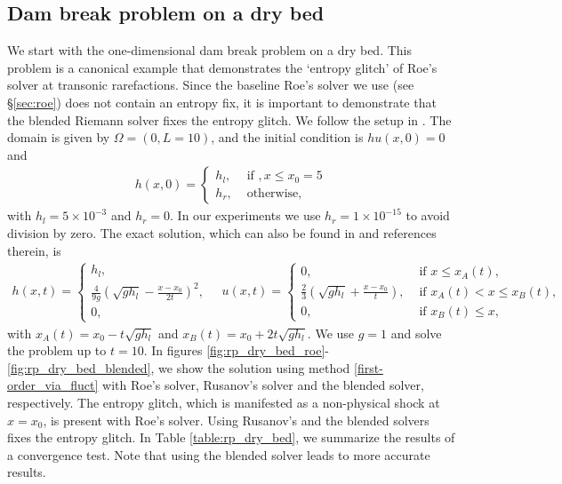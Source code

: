 \documentclass[preprint, 11pt]{article}
\begin{document}
\subsection{Dam break problem on a dry bed}\label{sec:rp_dry_bed}
We start with the one-dimensional dam break problem on a dry bed. 
This problem is a canonical example that demonstrates the `entropy glitch' of Roe's solver 
at transonic rarefactions. Since the baseline Roe's solver we use (see \S\ref{sec:roe}) does not contain 
an entropy fix, it is important to demonstrate that the blended Riemann solver fixes the entropy glitch.
We follow the setup in \cite[\S 4.1.2]{delestre2013swashes}.
The domain is given by $\Omega=(0,L=10)$, and the initial condition is $hu(x,0)=0$ and
\begin{align*}
  h(x,0)=
  \begin{cases}
    h_l, & \mbox{ if }, x\leq x_0=5 \\
    h_r, &\mbox{ otherwise},
  \end{cases}
\end{align*}
with $h_l=5\times 10^{-3}$ and $h_r=0$. In our experiments we use $h_r=1\times 10^{-15}$ to avoid division by zero.
The exact solution, which can also be found in \cite{delestre2013swashes} and references therein, is 
\begin{align*}
  h(x,t) = 
  \begin{cases}
    h_l, \\
    \frac{4}{9g}\left(\sqrt{gh_l}-\frac{x-x_0}{2t}\right)^2, \\
    0,
  \end{cases}
\quad 
  u(x,t) = 
  \begin{cases}
    0, &\mbox{ if } x\leq x_A(t), \\
    \frac{2}{3}\left(\sqrt{gh_l}+\frac{x-x_0}{t}\right), & \mbox{ if } x_A(t) < x\leq x_B(t), \\
    0, &\mbox{ if } x_B(t)\leq x,
  \end{cases}
\end{align*}
with $x_A(t)=x_0-t\sqrt{gh_l}$ and $x_B(t)=x_0+2t\sqrt{gh_l}$.
We use $g=1$ and solve the problem up to $t=10$.
In figures \ref{fig:rp_dry_bed_roe}-\ref{fig:rp_dry_bed_blended},
we show the solution using method \eqref{first-order_via_fluct} 
with Roe's solver, Rusanov's solver and the blended solver, respectively.
The entropy glitch, which is manifested as a non-physical shock at $x=x_0$,
is present with Roe's solver. Using Rusanov's and the blended solvers
fixes the entropy glitch.
In Table \ref{table:rp_dry_bed}, we summarize the results of a convergence test. 
Note that using the blended solver leads to more accurate results. 
\end{document}
